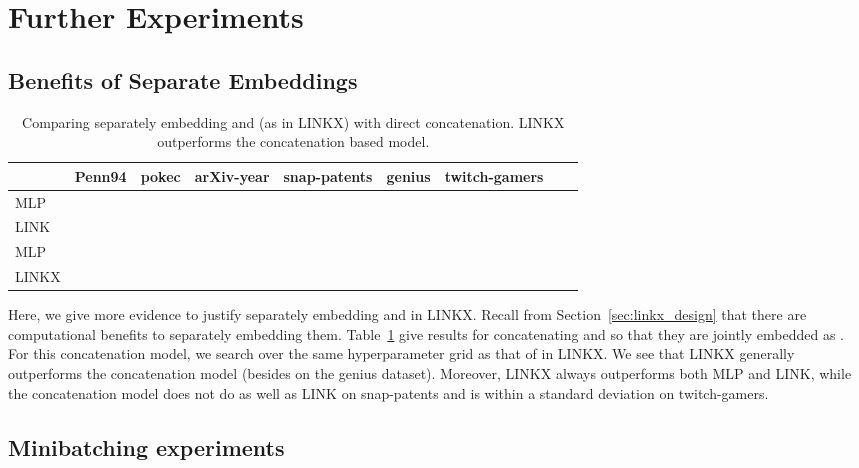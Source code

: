 \documentclass{article}
\newcommand{\bestcell}{\cellcolor{blue!25}}
\begin{document}
\section{Further Experiments}

\subsection{Benefits of Separate Embeddings} \label{sec:linkx_ablation}

\begin{table}[ht]
    \caption{Comparing separately embedding  and  (as in LINKX) with direct concatenation. LINKX outperforms the concatenation based model.}
    \centering
    \label{tab:linkx_ablation}
    {\scriptsize
    \begin{tabular}{lllllllll}
    \toprule
	 & Penn94 &  pokec &   arXiv-year & snap-patents & genius & twitch-gamers \\
    \midrule
	MLP &   &  &  &  &  &  \\    
     LINK  &  &   &   &   &  &  \\    
     \midrule
	 MLP &  &   &   &  & \bestcell  &  \\
	 LINKX &  \bestcell  & \bestcell   &  \bestcell  & \bestcell  &   & \bestcell \\
    \bottomrule
    \end{tabular}
    }
\end{table}


Here, we give more evidence to justify separately embedding  and  in LINKX. Recall from Section~\ref{sec:linkx_design} that there are computational benefits to separately embedding them.
Table~\ref{tab:linkx_ablation} give results for concatenating  and  so that they are jointly embedded as . For this concatenation model, we search over the same hyperparameter grid as that of  in LINKX. We see that LINKX generally outperforms the concatenation model (besides on the genius dataset). Moreover, LINKX always outperforms both MLP and LINK, while the concatenation model does not do as well as LINK on snap-patents and is within a standard deviation on twitch-gamers.


\subsection{Minibatching experiments} \label{sec:appendix_minibatch_exp}
\end{document}
